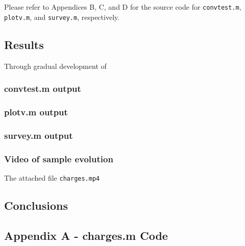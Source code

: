 \documentclass[10pt]{article}
\def\code#1{\texttt{#1}}
\begin{document}
Please refer to Appendices B, C, and D for the source code for \code{convtest.m}, \code{plotv.m}, and
\code{survey.m}, respectively.

\subsection*{Results}

Through gradual development of 

\subsubsection*{convtest.m output}

\subsubsection*{plotv.m output}

\subsubsection*{survey.m output}

\subsubsection*{Video of sample evolution}

The attached file \code{charges.mp4}

\pagebreak

\subsection*{Conclusions}


\pagebreak

\subsection*{Appendix A - charges.m Code}

\end{document}
